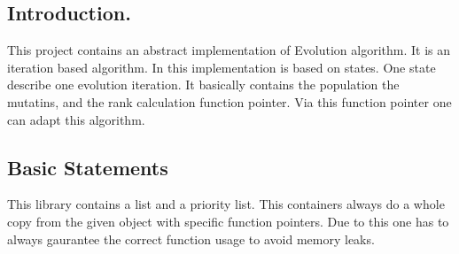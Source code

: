 \hypertarget{index_intro}{}\subsection{Introduction.}\label{index_intro}
This project contains an abstract implementation of Evolution algorithm. It is an iteration based algorithm. In this implementation is based on states. One state describe one evolution iteration. It basically contains the population the mutatins, and the rank calculation function pointer. Via this function pointer one can adapt this algorithm.\hypertarget{index_basic_things}{}\subsection{Basic Statements}\label{index_basic_things}
This library contains a list and a priority list. This containers always do a whole copy from the given object with specific function pointers. Due to this one has to always gaurantee the correct function usage to avoid memory leaks. 